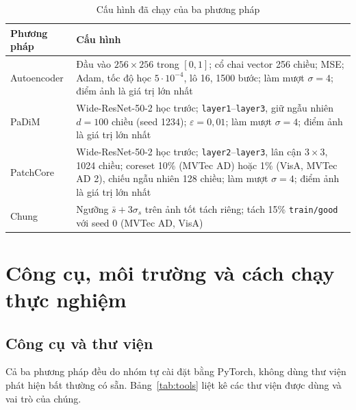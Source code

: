 \begin{table}[htbp]
  \centering
  \caption{Cấu hình đã chạy của ba phương pháp}
  \label{tab:hyper}
  \small
  \begin{tabular}{@{}>{\raggedright\arraybackslash}p{2.5cm} >{\raggedright\arraybackslash}p{12cm}@{}}
    \toprule
    Phương pháp & Cấu hình \\
    \midrule
    Autoencoder & Đầu vào $256\times256$ trong $[0,1]$; cổ chai vector 256 chiều; MSE; Adam, tốc độ học $5\cdot10^{-4}$,
                  lô 16, 1500 bước; làm mượt $\sigma = 4$; điểm ảnh là giá trị lớn nhất \\
    PaDiM       & Wide-ResNet-50-2 học trước; \texttt{layer1}--\texttt{layer3}, giữ ngẫu nhiên $d = 100$ chiều (seed 1234);
                  $\varepsilon = 0{,}01$; làm mượt $\sigma = 4$; điểm ảnh là giá trị lớn nhất \\
    PatchCore   & Wide-ResNet-50-2 học trước; \texttt{layer2}--\texttt{layer3}, lân cận $3\times3$, 1024 chiều; coreset
                  10\% (MVTec AD) hoặc 1\% (VisA, MVTec AD 2), chiếu ngẫu nhiên 128 chiều; làm mượt $\sigma = 4$;
                  điểm ảnh là giá trị lớn nhất \\
    Chung       & Ngưỡng $\bar{s} + 3\sigma_s$ trên ảnh tốt tách riêng; tách 15\% \texttt{train/good} với seed 0
                  (MVTec AD, VisA) \\
    \bottomrule
  \end{tabular}
\end{table}

\section{Công cụ, môi trường và cách chạy thực nghiệm}
\label{sec:cai-dat}
\label{sec:thiet-lap}

\subsection{Công cụ và thư viện}

Cả ba phương pháp đều do nhóm tự cài đặt bằng PyTorch, không dùng thư viện phát hiện bất thường có sẵn.
Bảng~\ref{tab:tools} liệt kê các thư viện được dùng và vai trò của chúng.

